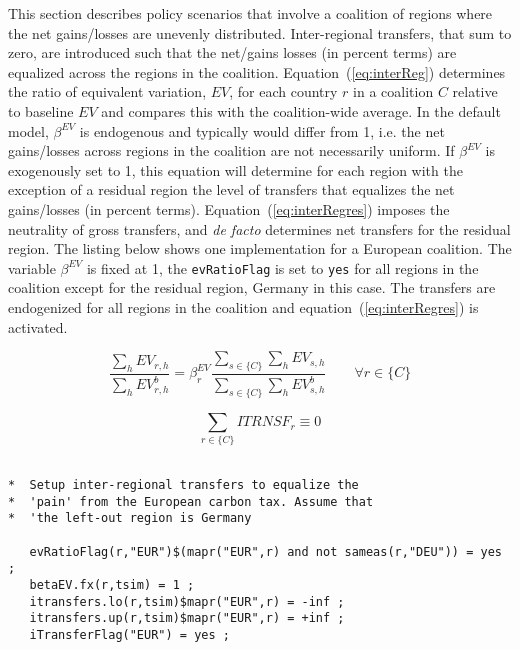\documentclass[11pt,letterpaper]{report}
\begin{document}
This section describes policy scenarios that involve a coalition
of regions where the net gains/losses are unevenly distributed.
Inter-regional transfers, that sum to zero, are introduced such that the net/gains
losses (in percent terms) are equalized across the regions in the coalition. Equation~(\ref{eq:interReg}) determines the ratio
of equivalent variation, $\mathit{EV}$, for each country $r$ in a coalition $C$
relative to baseline $\mathit{EV}$ and compares this
with the coalition-wide average. In the default model, $\beta^{\mathit{EV}}$
is endogenous and typically would differ from 1, i.e. the net gains/losses across regions in the coalition are not necessarily uniform.
If $\beta^{\mathit{EV}}$ is exogenously set to 1, this equation
will determine for each region with the exception of a residual region
the level of transfers that equalizes the net gains/losses (in
percent terms). Equation~(\ref{eq:interRegres}) imposes the neutrality
of gross transfers, and \emph{de facto} determines net transfers for
the residual region. The listing below shows one implementation
for a European coalition. The variable $\beta^{\mathit{EV}}$ is fixed at 1,
the \texttt{evRatioFlag} is set to \texttt{yes} for all regions
in the coalition except for the residual region, Germany in this case. The transfers
are endogenized for all regions in the coalition and equation~(\ref{eq:interRegres})
is activated.

\begin{equation}
\label{eq:interReg}
\frac {\displaystyle  \sum_h{\mathit{EV}_{r,h}}} {\displaystyle \sum_h{\mathit{EV}^b_{r,h}}}
= \beta^{\mathit{EV}}_r
\frac {\displaystyle \sum_{s \in \{C\}} {\sum_h{\mathit{EV}_{s,h}}}} {\displaystyle \sum_{s \in \{C\}} {\sum_h{\mathit{EV}^b_{s,h}}}} \qquad \forall r \in \{C\}
\end{equation}

\begin{equation}
\label{eq:interRegres}
\sum_{r \in \{C\}}{\mathit{ITRNSF}_r} \equiv 0
\end{equation}

\begin{lstlisting}[language=GAMS,
	caption={Neutral inter-regional transfers}, label=lst:TrClosure]

*  Setup inter-regional transfers to equalize the
*  'pain' from the European carbon tax. Assume that
*  'the left-out region is Germany

   evRatioFlag(r,"EUR")$(mapr("EUR",r) and not sameas(r,"DEU")) = yes ;
   betaEV.fx(r,tsim) = 1 ;
   itransfers.lo(r,tsim)$mapr("EUR",r) = -inf ;
   itransfers.up(r,tsim)$mapr("EUR",r) = +inf ;
   iTransferFlag("EUR") = yes ;

\end{lstlisting}
\end{document}
